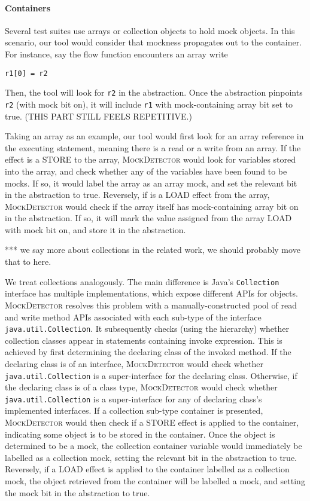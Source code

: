 \paragraph{Containers} Several test suites use arrays or collection objects to hold mock objects. In this scenario, our tool would consider that mockness propagates out to the container. For instance, say the flow function encounters an array write \begin{lstlisting}[basicstyle=\ttfamily\small,numbers=none]
r1[0] = r2
\end{lstlisting} 
Then, the tool will look for \texttt{r2} in the abstraction. Once the abstraction pinpoints \texttt{r2} (with mock bit on), it will include \texttt{r1} with mock-containing array bit set to true. (THIS PART STILL FEELS REPETITIVE.)


Taking an array as an example, our tool would first look for an array reference in the executing statement, meaning there is a read or a write from an array. If the effect is a STORE to the array, \textsc{MockDetector} would look for variables stored into the array, and check whether any of the variables have been found to be mocks. If so, it would label the array as an array mock, and set the relevant bit in the abstraction to true. Reversely, if is a LOAD effect from the array, \textsc{MockDetector} would check if the array itself has mock-containing array bit on in the abstraction. If so, it will mark the value assigned from the array LOAD with mock bit on, and store it in the abstraction.

*** we say more about collections in the related work, we should probably move that to here.

We treat collections analogously. The main difference is Java's \texttt{Collection} interface has multiple implementations, which expose different APIs for objects. \textsc{MockDetector} resolves this problem with a manually-constructed pool of read and write method APIs associated with each sub-type of the interface \texttt{java.util.Collection}. It subsequently checks (using the hierarchy) whether collection classes appear in statements containing invoke expression. This is achieved by first determining the declaring class of the invoked method. If the declaring class is of an interface, \textsc{MockDetector} would check whether \texttt{java.util.Collection} is a super-interface for the declaring class. Otherwise, if the declaring class is of a class type, \textsc{MockDetector} would check whether \texttt{java.util.Collection} is a super-interface for any of declaring class's implemented interfaces. If a collection sub-type container is presented, \textsc{MockDetector} would then check if a STORE effect is applied to the container, indicating some object is to be stored in the container. Once the object is determined to be a mock, the collection container variable would immediately be labelled as a collection mock, setting the relevant bit in the abstraction to true. Reversely, if a LOAD effect is applied to the container labelled as a collection mock, the object retrieved from the container will be labelled a mock, and setting the mock bit in the abstraction to true.


